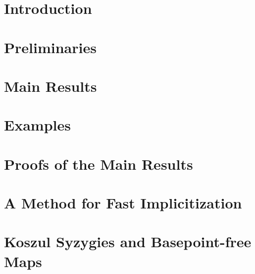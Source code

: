 \documentclass[phd,tocprelim]{cornell}
\numberwithin{first}{chapter}
\begin{document}
\contentspage

\normalspacing \setcounter{page}{1} 
\pagestyle{cornell} \addtolength{\parskip}{0.5\baselineskip}


\chapter{Introduction}
\label{ch:intro}


\chapter{Preliminaries}
\label{ch:preliminaries}


\chapter{Main Results}
\label{ch:main-results}


\chapter{Examples}
\label{ch:examples}


\chapter{Proofs of the Main Results}
\label{ch:main-proofs}


\chapter{A Method for Fast Implicitization}
\label{ch:fast-method}


\chapter{Koszul Syzygies and Basepoint-free Maps}
\label{ch:koszul-bpf}


% 



\end{document}
